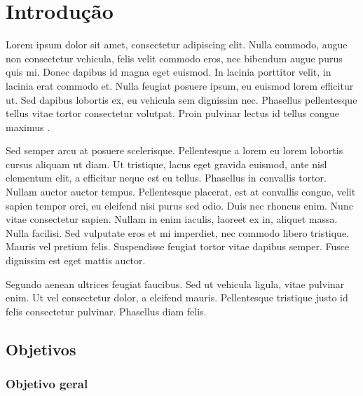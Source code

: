 \documentclass[brazil,hardcopy,openany,a4paper]{_ufscthesis}
\begin{document}
	
	\frontmatter
	\folhadeaprovacao{}{} %
	\paginaresumo
	\paginaabstract
	\listadefiguras %
	\listadetabelas 
	\sumario
	\mainmatter

	\chapter{Introdução}
	\label{chapter:introducao}
	
	Lorem ipsum dolor sit amet, consectetur adipiscing elit. Nulla commodo, augue non consectetur vehicula, felis velit commodo eros, nec bibendum augue purus quis mi. Donec dapibus id magna eget euismod. In lacinia porttitor velit, in lacinia erat commodo et. Nulla feugiat posuere ipsum, eu euismod lorem efficitur ut. Sed dapibus lobortis ex, eu vehicula sem dignissim nec. Phasellus pellentesque tellus vitae tortor consectetur volutpat. Proin pulvinar lectus id tellus congue maximus \cite{2002boundary}.
	
	Sed semper arcu at posuere scelerisque. Pellentesque a lorem eu lorem lobortis cursus aliquam ut diam. Ut tristique, lacus eget gravida euismod, ante nisl elementum elit, a efficitur neque est eu tellus. Phasellus in convallis tortor. Nullam auctor auctor tempus. Pellentesque placerat, est at convallis congue, velit sapien tempor orci, eu eleifend nisi purus sed odio. Duis nec rhoncus enim. Nunc vitae consectetur sapien. Nullam in enim iaculis, laoreet ex in, aliquet massa. Nulla facilisi. Sed vulputate eros et mi imperdiet, nec commodo libero tristique. Mauris vel pretium felis. Suspendisse feugiat tortor vitae dapibus semper. Fusce dignissim est eget mattis auctor.
	
	Segundo  \cite{Chen2013} aenean ultrices feugiat faucibus. Sed ut vehicula ligula, vitae pulvinar enim. Ut vel consectetur dolor, a eleifend mauris. Pellentesque tristique justo id felis consectetur pulvinar. Phasellus diam felis.
	
	\section{Objetivos}
		\subsection{Objetivo geral}
\end{document}
